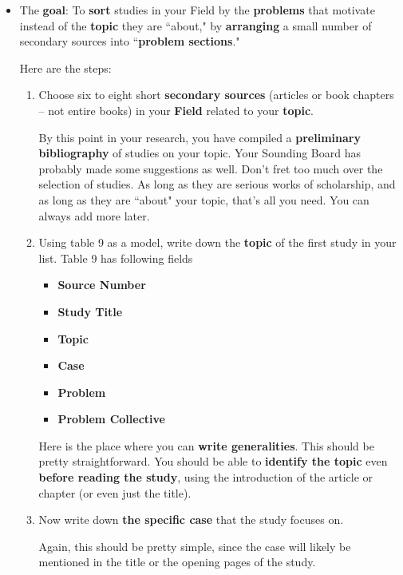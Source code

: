 \documentclass[11pt]{article}
\begin{document}
\begin{itemize}
\item \begin{exercise}

The \textbf{goal}: To \textbf{sort} studies in your Field by the \textbf{problems} that motivate instead of the \textbf{topic} they are ``about," by \textbf{arranging} a small number of secondary sources into ``\textbf{problem sections}."

Here are the steps:
\begin{enumerate}
\item Choose six to eight short \textbf{secondary sources} (articles or book chapters -- not entire books) in your \textbf{Field} related to your \textbf{topic}. 

By this point in your research, you have compiled a \textbf{preliminary bibliography} of studies on your topic. Your Sounding Board has probably made some suggestions as well. Don’t fret too much over the selection of studies. As long as they are serious works of scholarship, and as long as they are ``about" your topic, that’s all you need. You can always add more later.

\item Using table 9 as a model, write down the \textbf{topic} of the first study in your list. Table 9 has following fields
\begin{itemize}
\item \textbf{Source Number}
\item \textbf{Study Title}
\item \textbf{Topic}
\item \textbf{Case}
\item \textbf{Problem}
\item \textbf{Problem Collective}
\end{itemize}

Here is the place where you can \textbf{write generalities}. This should be pretty straightforward. You should be able to \textbf{identify the topic} even \textbf{before reading the study}, using the introduction of the article or chapter (or even just the title).

\item  Now write down \textbf{the specific case} that the study focuses on. 

Again, this should be pretty simple, since the case will likely be mentioned in the title or the opening pages of the study.


\end{enumerate}
\end{exercise}
\end{itemize}
\end{document}
